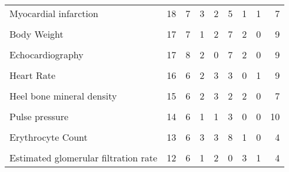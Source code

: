 \begin{table}[!ht]
{\begin{tabular}[!ht]{lrrrrrrrr}
Myocardial infarction & 18 & 7 & 3 & 2 & 5 & 1 & 1 & 7\\
\cellcolor{gray!6}{Autism spectrum disorder or schizophrenia} & \cellcolor{gray!6}{17} & \cellcolor{gray!6}{6} & \cellcolor{gray!6}{1} & \cellcolor{gray!6}{5} & \cellcolor{gray!6}{2} & \cellcolor{gray!6}{1} & \cellcolor{gray!6}{2} & \cellcolor{gray!6}{8}\\
Body Weight & 17 & 7 & 1 & 2 & 7 & 2 & 0 & 9\\
\cellcolor{gray!6}{Cholesterol} & \cellcolor{gray!6}{17} & \cellcolor{gray!6}{7} & \cellcolor{gray!6}{1} & \cellcolor{gray!6}{3} & \cellcolor{gray!6}{5} & \cellcolor{gray!6}{0} & \cellcolor{gray!6}{2} & \cellcolor{gray!6}{11}\\
Echocardiography & 17 & 8 & 2 & 0 & 7 & 2 & 0 & 9\\
\cellcolor{gray!6}{Stroke} & \cellcolor{gray!6}{17} & \cellcolor{gray!6}{8} & \cellcolor{gray!6}{1} & \cellcolor{gray!6}{2} & \cellcolor{gray!6}{3} & \cellcolor{gray!6}{0} & \cellcolor{gray!6}{3} & \cellcolor{gray!6}{13}\\
Heart Rate & 16 & 6 & 2 & 3 & 3 & 0 & 1 & 9\\
\cellcolor{gray!6}{Iron} & \cellcolor{gray!6}{16} & \cellcolor{gray!6}{7} & \cellcolor{gray!6}{1} & \cellcolor{gray!6}{2} & \cellcolor{gray!6}{0} & \cellcolor{gray!6}{0} & \cellcolor{gray!6}{2} & \cellcolor{gray!6}{13}\\
Heel bone mineral density & 15 & 6 & 2 & 3 & 2 & 2 & 0 & 7\\
\cellcolor{gray!6}{Obesity-related traits} & \cellcolor{gray!6}{15} & \cellcolor{gray!6}{7} & \cellcolor{gray!6}{2} & \cellcolor{gray!6}{1} & \cellcolor{gray!6}{3} & \cellcolor{gray!6}{0} & \cellcolor{gray!6}{2} & \cellcolor{gray!6}{11}\\
Pulse pressure & 14 & 6 & 1 & 1 & 3 & 0 & 0 & 10\\
\cellcolor{gray!6}{Chronotype} & \cellcolor{gray!6}{13} & \cellcolor{gray!6}{6} & \cellcolor{gray!6}{1} & \cellcolor{gray!6}{0} & \cellcolor{gray!6}{3} & \cellcolor{gray!6}{1} & \cellcolor{gray!6}{0} & \cellcolor{gray!6}{9}\\
Erythrocyte Count & 13 & 6 & 3 & 3 & 8 & 1 & 0 & 4\\
\cellcolor{gray!6}{Crohn's disease} & \cellcolor{gray!6}{12} & \cellcolor{gray!6}{7} & \cellcolor{gray!6}{0} & \cellcolor{gray!6}{3} & \cellcolor{gray!6}{4} & \cellcolor{gray!6}{0} & \cellcolor{gray!6}{4} & \cellcolor{gray!6}{4}\\
Estimated glomerular filtration rate & 12 & 6 & 1 & 2 & 0 & 3 & 1 & 4\\

\end{tabular}}
\end{table}
